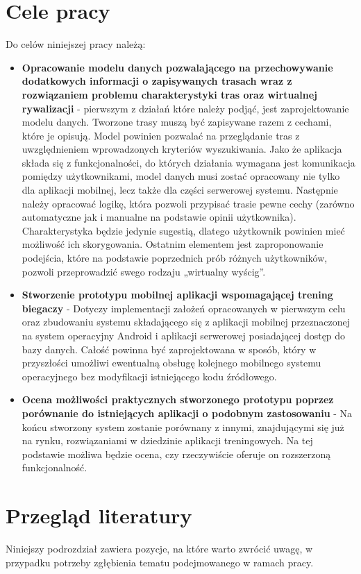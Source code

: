 \section{Cele pracy}\label{chap:cele-pracy}
Do celów niniejszej pracy należą:
\begin{itemize}
\item \textbf{Opracowanie modelu danych pozwalającego na przechowywanie dodatkowych informacji o zapisywanych trasach wraz z rozwiązaniem problemu charakterystyki tras oraz wirtualnej rywalizacji} - pierwszym z działań które należy podjąć, jest zaprojektowanie modelu danych. Tworzone trasy muszą być zapisywane razem z cechami, które je opisują. Model powinien pozwalać na przeglądanie tras z uwzględnieniem wprowadzonych kryteriów wyszukiwania. Jako że aplikacja składa się z funkcjonalności, do których działania wymagana jest komunikacja pomiędzy użytkownikami, model danych musi zostać opracowany nie tylko dla aplikacji mobilnej, lecz także dla części serwerowej systemu. Następnie należy opracować logikę, która pozwoli przypisać trasie pewne cechy (zarówno automatyczne jak i manualne na podstawie opinii użytkownika). Charakterystyka będzie jedynie sugestią, dlatego użytkownik powinien mieć możliwość ich skorygowania. Ostatnim elementem jest zaproponowanie podejścia, które na podstawie poprzednich prób różnych użytkowników, pozwoli przeprowadzić swego rodzaju „wirtualny wyścig”.
\item \textbf{Stworzenie prototypu mobilnej aplikacji wspomagającej trening biegaczy} - Dotyczy implementacji założeń opracowanych w pierwszym celu oraz zbudowaniu systemu składającego się z aplikacji mobilnej przeznaczonej na system operacyjny Android i aplikacji serwerowej posiadającej dostęp do bazy danych. Całość powinna być zaprojektowana w sposób, który w przyszłości umożliwi ewentualną obsługę kolejnego mobilnego systemu operacyjnego bez modyfikacji istniejącego kodu źródłowego.
\item \textbf{Ocena możliwości praktycznych stworzonego prototypu poprzez porównanie do istniejących aplikacji o podobnym zastosowaniu} - Na końcu stworzony system zostanie porównany z innymi, znajdującymi się już na rynku, rozwiązaniami w dziedzinie aplikacji treningowych. Na tej podstawie możliwa będzie ocena, czy rzeczywiście oferuje on rozszerzoną funkcjonalność.
\end{itemize}

\section{Przegląd literatury}
Niniejszy podrozdział zawiera pozycje, na które warto zwrócić uwagę, w przypadku potrzeby zgłębienia tematu podejmowanego w ramach pracy.
